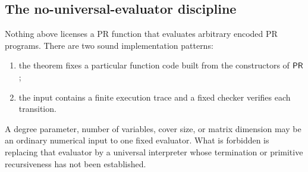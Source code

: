 \subsection{The no-universal-evaluator discipline}

Nothing above licenses a PR function that evaluates arbitrary encoded PR programs.  There are two
sound implementation patterns:

\begin{enumerate}[label=\arabic*.]
\item the theorem fixes a particular function code built from the constructors of $\mathsf{PR}$;
\item the input contains a finite execution trace and a fixed checker verifies each transition.
\end{enumerate}

A degree parameter, number of variables, cover size, or matrix dimension may be an ordinary numerical
input to one fixed evaluator.  What is forbidden is replacing that evaluator by a universal
interpreter whose termination or primitive recursiveness has not been established.

